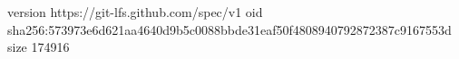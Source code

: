 version https://git-lfs.github.com/spec/v1
oid sha256:573973e6d621aa4640d9b5c0088bbde31eaf50f4808940792872387c9167553d
size 174916

